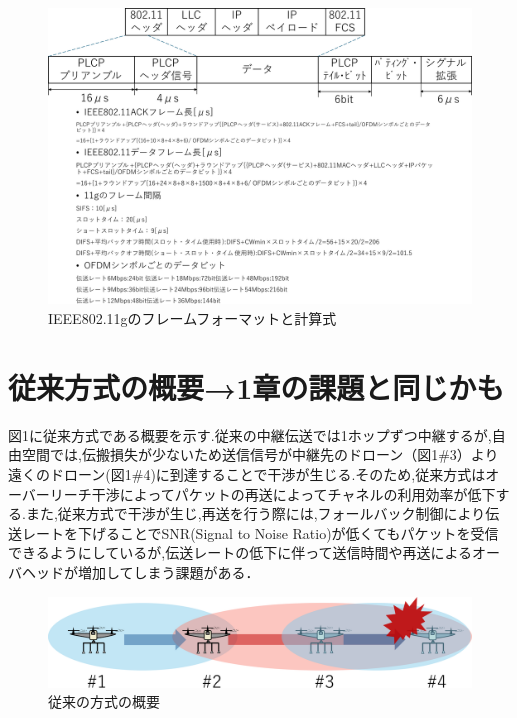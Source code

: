 \documentclass[a4paper,10.5pt]{ltjsarticle}
\begin{document}
\begin{figure}[H]
  \centering
  \includegraphics[width=\linewidth]{11g_frameformat.pdf} %
  \caption{IEEE802.11gのフレームフォーマットと計算式}
  \label{fig:11g_frameformat} %
\end{figure}


\clearpage
\section{従来方式の概要→1章の課題と同じかも}
図1に従来方式である概要を示す.従来の中継伝送では1ホップずつ中継するが,自由空間では,伝搬損失が少ないため送信信号が中継先のドローン（図1\#3）より遠くのドローン(図1\#4)に到達することで干渉が生じる.そのため,従来方式はオーバーリーチ干渉によってパケットの再送によってチャネルの利用効率が低下する.また,従来方式で干渉が生じ,再送を行う際には,フォールバック制御により伝送レートを下げることでSNR(Signal to Noise Ratio)が低くてもパケットを受信できるようにしているが,伝送レートの低下に伴って送信時間や再送によるオーバヘッドが増加してしまう課題がある．

\begin{figure}[H]
  \centering
  \includegraphics[width=\linewidth]{cenventional_topology.pdf} %
  \caption{従来の方式の概要}
  \label{fig:従来の方式のトポロジー} %
\end{figure}
\end{document}
